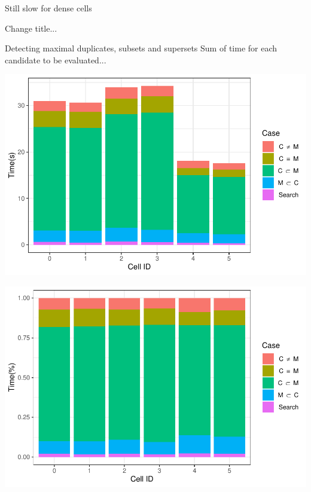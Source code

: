 \documentclass{beamer}
\begin{document}
\begin{frame}{Still slow for dense cells}
\begin{frame}{Change title...}
        \centering
\end{frame}

\begin{frame}{Detecting maximal duplicates, subsets and supersets}
        {Sum of time for each candidate to be evaluated...}
        \centering
        \begin{minipage}{0.49\textwidth}
                \includegraphics[width=\textwidth]{figures/Maximals/performanceBySum1}
        \end{minipage} %
        \begin{minipage}{0.49\textwidth}
                \includegraphics[width=\textwidth]{figures/Maximals/performanceBySum2}
        \end{minipage}
\end{frame}


\end{frame}
\end{document}
